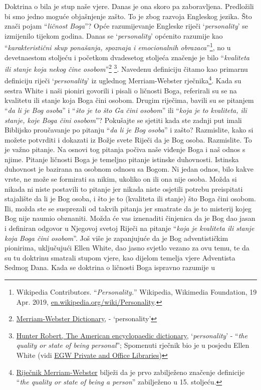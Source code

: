 Doktrina o  bila je stup naše vjere. Danas je ona skoro pa zaboravljena. Predložili bi smo jedno moguće objašnjenje zašto. To je zbog razvoja Engleskog jezika. Što znači pojam “\textit{ličnost Boga}”? Opće razumijevanje Engleske riječi ‘\textit{personality}’ se izmijenilo tijekom godina. Danas se ‘\textit{personality}’ općenito razumije kao “\textit{karakteristični skup ponašanja, spoznaja i emocionalnih obrazaca}”\footnote{Wikipedia Contributors. “\textit{Personality.}” Wikipedia, Wikimedia Foundation, 19 Apr. 2019, \href{https://en.wikipedia.org/wiki/Personality}{en.wikipedia.org/wiki/Personality}.}, no u devetnaestom stoljeću i početkom dvadesetog stoljeća značenje je bilo “\textit{kvaliteta ili stanje koja nekog čine osobom}”\footnote{\href{https://www.merriam-webster.com/dictionary/personality}{Merriam-Webster Dictionary}, - ‘personality'} \footnote{\href{https://babel.hathitrust.org/cgi/pt?id=mdp.39015050663213&view=1up&seq=780}{Hunter Robert, The American encyclopaedic dictionary}, ‘\textit{personality}’ - “\textit{the quality or state of being personal}”; Spomenuti rječnik bio je u posjedu Ellen White (vidi \href{https://repo.adventistdigitallibrary.org/PDFs/adl-22/adl-22251050.pdf?_ga=2.116010630.1065317374.1621993520-1506151612.1617862694&fbclid=IwAR3vwmp8jxtnpPEKv0KD9mCv8dJpmRGoyIXW0CkbQAjbU0h6YaBGqhgBzbk}{EGW Private and Office Libraries})}. Navedenu definiciju čitamo kao primarnu definiciju riječi ‘\textit{personality}’ iz uglednog Merriam-Webster rječnika\footnote{\href{https://www.merriam-webster.com/dictionary/personality\#word-history}{Riječnik Merriam-Webster} bilježi da je prvo zabilježeno značenje definicije “\textit{the quality or state of being a person}” zabilježeno u 15. stoljeću.}. Kada su sestra White i naši pioniri govorili i pisali o ličnosti Boga, referirali su se na kvalitetu ili stanje koja Boga čini osobom. Drugim riječima, bavili su se pitanjem “\textit{da li je Bog osoba}” i “\textit{što je to što Ga čini osobom}” ili “\textit{koja je to kvaliteta, ili stanje, koje Boga čini osobom}”? Pokušajte se sjetiti kada ste zadnji put imali Biblijsko proučavanje po pitanju “\textit{da li je Bog osoba}” i zašto? Razmislite, kako si možete potvrditi i dokazati iz Božje svete Riječi da je Bog osoba. Razmislite. To je važno pitanje. Na osnovi tog pitanja počiva naše viđenje Boga i naš odnos s njime. Pitanje ličnosti Boga je temeljno pitanje istinske duhovnosti. Istinska duhovnost je bazirana na osobnom odnosu sa Bogom. Ni jedan odnos, bilo kakve vrste, ne može se formirati sa nikim, ukoliko on ili ona nije osoba. Možda si nikada ni niste postavili to pitanje jer nikada niste osjetili potrebu preispitati stajalište da li je Bog osoba, i što je to (kvaliteta ili stanje) što Boga čini osobom. Ili, možda ste se susprezali od takvih pitanja jer smatrate da je to misterij kojeg Bog nije naumio obznaniti. Možda će vas iznenaditi činjenica da je Bog dao jasan i definiran odgovor u Njegovoj svetoj Riječi na pitanje “\textit{koja je kvaliteta ili stanje koja Boga čini osobom}”. Još više je zapanjujuće da je Bog adventističkim pionirima, uključujući Ellen White, dao jasno svjetlo vezano za ovu temu, te da su tu doktrinu smatrali stupom vjere, kao dijelom temelja vjere Adventista Sedmog Dana. Kada se doktrina o ličnosti Boga ispravno razumije u 